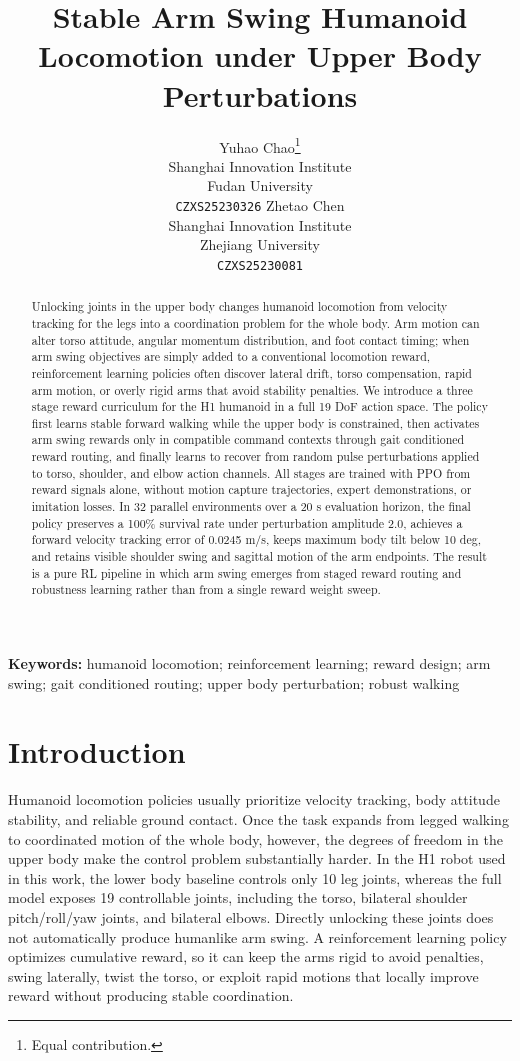 \documentclass{article}
\title{Stable Arm Swing Humanoid Locomotion under Upper Body Perturbations}
\author{%
  Yuhao Chao\thanks{Equal contribution.} \\
  Shanghai Innovation Institute \\
  Fudan University \\
  \texttt{CZXS25230326}
  \And
  Zhetao Chen\footnotemark[1] \\
  Shanghai Innovation Institute \\
  Zhejiang University \\
  \texttt{CZXS25230081}
}
\begin{document}
\maketitle

\begin{abstract}
Unlocking joints in the upper body changes humanoid locomotion from velocity tracking for the legs into a coordination problem for the whole body. Arm motion can alter torso attitude, angular momentum distribution, and foot contact timing; when arm swing objectives are simply added to a conventional locomotion reward, reinforcement learning policies often discover lateral drift, torso compensation, rapid arm motion, or overly rigid arms that avoid stability penalties. We introduce a three stage reward curriculum for the H1 humanoid in a full 19 DoF action space. The policy first learns stable forward walking while the upper body is constrained, then activates arm swing rewards only in compatible command contexts through gait conditioned reward routing, and finally learns to recover from random pulse perturbations applied to torso, shoulder, and elbow action channels. All stages are trained with PPO from reward signals alone, without motion capture trajectories, expert demonstrations, or imitation losses. In 32 parallel environments over a 20 s evaluation horizon, the final policy preserves a 100\% survival rate under perturbation amplitude 2.0, achieves a forward velocity tracking error of 0.0245 m/s, keeps maximum body tilt below 10 deg, and retains visible shoulder swing and sagittal motion of the arm endpoints. The result is a pure RL pipeline in which arm swing emerges from staged reward routing and robustness learning rather than from a single reward weight sweep.
\end{abstract}

\textbf{Keywords:} humanoid locomotion; reinforcement learning; reward design; arm swing; gait conditioned routing; upper body perturbation; robust walking

\section{Introduction}

Humanoid locomotion policies usually prioritize velocity tracking, body attitude stability, and reliable ground contact. Once the task expands from legged walking to coordinated motion of the whole body, however, the degrees of freedom in the upper body make the control problem substantially harder. In the H1 robot used in this work, the lower body baseline controls only 10 leg joints, whereas the full model exposes 19 controllable joints, including the torso, bilateral shoulder pitch/roll/yaw joints, and bilateral elbows. Directly unlocking these joints does not automatically produce humanlike arm swing. A reinforcement learning policy optimizes cumulative reward, so it can keep the arms rigid to avoid penalties, swing laterally, twist the torso, or exploit rapid motions that locally improve reward without producing stable coordination.
\end{document}
